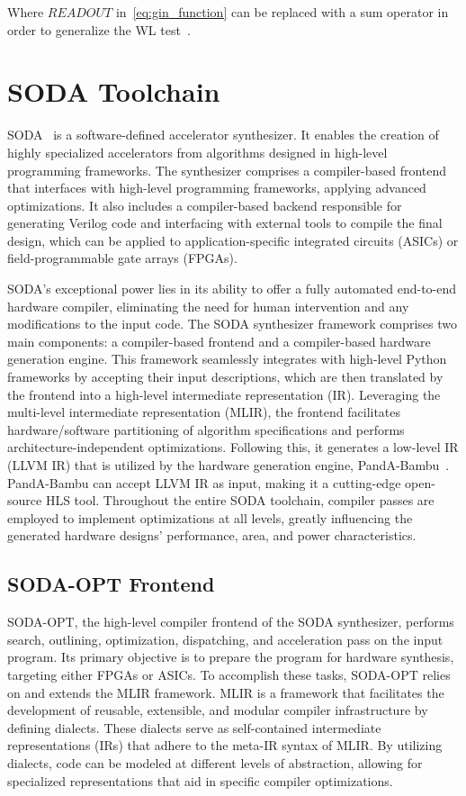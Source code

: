 Where $READOUT$ in~\ref{eq:gin_function} can be replaced with a sum operator in order to generalize the WL test~\cite{xu2019powerful}.


\section{SODA Toolchain}
\label{sec:soda}%

SODA~\cite{9786533} is a software-defined accelerator synthesizer.
It enables the creation of highly specialized accelerators from algorithms designed in high-level programming frameworks.
The synthesizer comprises a compiler-based frontend that interfaces with high-level programming frameworks, applying advanced optimizations.
It also includes a compiler-based backend responsible for generating Verilog code and interfacing with external tools to compile the final design, which can be applied to application-specific integrated circuits (ASICs) or field-programmable gate arrays (FPGAs).

SODA's exceptional power lies in its ability to offer a fully automated end-to-end hardware compiler, eliminating the need for human intervention and any modifications to the input code.
The SODA synthesizer framework comprises two main components: a compiler-based frontend and a compiler-based hardware generation engine.
This framework seamlessly integrates with high-level Python frameworks by accepting their input descriptions, which are then translated by the frontend into a high-level intermediate representation (IR).
Leveraging the multi-level intermediate representation (MLIR), the frontend facilitates hardware/software partitioning of algorithm specifications and performs architecture-independent optimizations.
Following this, it generates a low-level IR (LLVM IR) that is utilized by the hardware generation engine, PandA-Bambu~\cite{9586110}.
PandA-Bambu can accept LLVM IR as input, making it a cutting-edge open-source HLS tool.
Throughout the entire SODA toolchain, compiler passes are employed to implement optimizations at all levels, greatly influencing the generated hardware designs' performance, area, and power characteristics.

\subsection{SODA-OPT Frontend}
\label{subsec:soda_frontend}%

SODA-OPT, the high-level compiler frontend of the SODA synthesizer, performs search, outlining, optimization, dispatching, and acceleration pass on the input program.
Its primary objective is to prepare the program for hardware synthesis, targeting either FPGAs or ASICs.
To accomplish these tasks, SODA-OPT relies on and extends the MLIR framework.
MLIR is a framework that facilitates the development of reusable, extensible, and modular compiler infrastructure by defining dialects.
These dialects serve as self-contained intermediate representations (IRs) that adhere to the meta-IR syntax of MLIR.
By utilizing dialects, code can be modeled at different levels of abstraction, allowing for specialized representations that aid in specific compiler optimizations.

